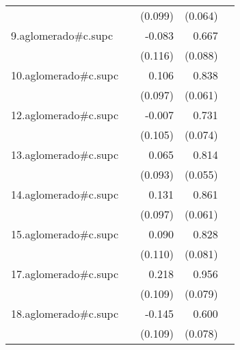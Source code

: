 {\begin{longtable}{l*{4}{D{.}{.}{-1}}}
            &                     &     (0.099)         &     (0.064)         &                     \\
\addlinespace
9.aglomerado#c.supc&                     &      -0.083         &       0.667\sym{***}&                     \\
            &                     &     (0.116)         &     (0.088)         &                     \\
\addlinespace
10.aglomerado#c.supc&                     &       0.106         &       0.838\sym{***}&                     \\
            &                     &     (0.097)         &     (0.061)         &                     \\
\addlinespace
12.aglomerado#c.supc&                     &      -0.007         &       0.731\sym{***}&                     \\
            &                     &     (0.105)         &     (0.074)         &                     \\
\addlinespace
13.aglomerado#c.supc&                     &       0.065         &       0.814\sym{***}&                     \\
            &                     &     (0.093)         &     (0.055)         &                     \\
\addlinespace
14.aglomerado#c.supc&                     &       0.131         &       0.861\sym{***}&                     \\
            &                     &     (0.097)         &     (0.061)         &                     \\
\addlinespace
15.aglomerado#c.supc&                     &       0.090         &       0.828\sym{***}&                     \\
            &                     &     (0.110)         &     (0.081)         &                     \\
\addlinespace
17.aglomerado#c.supc&                     &       0.218\sym{*}  &       0.956\sym{***}&                     \\
            &                     &     (0.109)         &     (0.079)         &                     \\
\addlinespace
18.aglomerado#c.supc&                     &      -0.145         &       0.600\sym{***}&                     \\
            &                     &     (0.109)         &     (0.078)         &                     \\

\end{longtable}}
